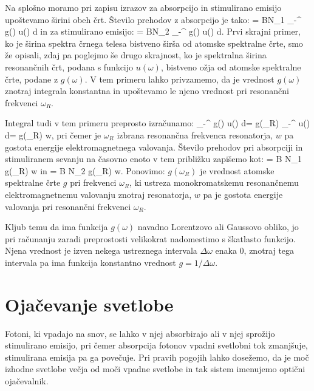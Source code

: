 Na splošno moramo pri zapisu izrazov za absorpcijo in stimulirano emisijo 
upoštevamo širini obeh črt. Število prehodov z absorpcijo je tako:
\beq
{} = BN_1 \int_{-\infty}^{\infty} g(\omega) u(\omega) d\omega
\label{eq:11_22}
\eeq
in za stimulirano emisijo:
\beq
{} = BN_2 \int_{-\infty}^{\infty} g(\omega) u(\omega) d\omega.
\label{eq:11_23}
\eeq
Prvi skrajni primer, ko je širina spektra črnega telesa bistveno širša
od atomske spektralne črte, smo že opisali, zdaj pa poglejmo še drugo skrajnost, 
ko je spektralna širina resonančnih črt, podana s funkcijo $u(\omega)$, bistveno 
ožja od atomske spektralne črte, podane z $g(\omega)$. V tem primeru 
lahko privzamemo, da je vrednost $g(\omega)$ znotraj integrala konstantna in 
upoštevamo le njeno vrednost pri resonančni frekvenci $\omega_R$.

Integral tudi v tem primeru preprosto izračunamo:
\beq
\int_{-\infty}^{\infty} g(\omega) u(\omega) d\omega = g(\omega_R) \int_{-\infty}^{\infty}
u(\omega) d\omega = g(\omega_R) w,
\label{eq:11_24}
\eeq
pri čemer je $\omega_R$ izbrana resonančna frekvenca resonatorja, $w$ pa gostota
energije elektromagnetnega valovanja. Število prehodov pri absorpciji
in stimuliranem sevanju na časovno enoto v tem približku zapišemo kot:
\beq
{} = B N_1 g(\omega_R) w
\label{eq:11_25}
\eeq
in
\beq
{} = B N_2 g(\omega_R) w.
\label{eq:11_26}
\eeq
Ponovimo: $g(\omega_R)$ je vrednost atomske spektralne črte $g$ pri 
frekvenci $\omega_R$, ki ustreza monokromatskemu resonančnemu 
elektromagnetnemu valovanju znotraj resonatorja, $w$ pa je gostota
energije valovanja pri resonančni frekvenci $\omega_R$. 

\begin{remark}
Kljub temu da ima funkcija $g(\omega)$ navadno Lorentzovo ali Gaussovo 
obliko, jo pri računanju zaradi preprostosti velikokrat nadomestimo 
s škatlasto funkcijo. Njena vrednost je izven nekega ustreznega 
intervala $\Delta \omega$ enaka 0, znotraj tega intervala pa ima 
funkcija konstantno vrednost $g = 1/\Delta \omega$.
\end{remark}

\section{Ojačevanje svetlobe}
Fotoni, ki vpadajo na snov, se lahko v njej absorbirajo ali v njej sprožijo
stimulirano emisijo, pri čemer absorpcija fotonov vpadni svetlobni tok 
zmanjšuje, stimulirana emisija pa ga povečuje. Pri pravih pogojih lahko
dosežemo, da je moč izhodne svetlobe večja od moči vpadne svetlobe in tak
sistem imenujemo optični ojačevalnik.

